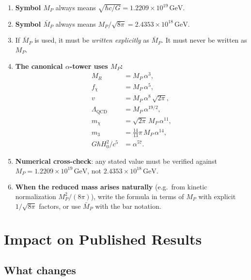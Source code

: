 \documentclass[11pt]{article}
\newcommand{\MP}{M_P}
\newcommand{\MPbar}{\bar{M}_P}
\newcommand{\GeV}{\,\mathrm{GeV}}
\begin{document}
\begin{tcolorbox}[colback=blue!5!white, colframe=blue!60!black,
  title=\textbf{DFD Convention Lock (to be applied in all future documents)}]

\begin{enumerate}
\item \textbf{Symbol $\MP$} always means $\sqrt{\hbar c/G} = 1.2209 \times 10^{19}\GeV$.
\item \textbf{Symbol $\MPbar$} always means $\MP/\sqrt{8\pi} = 2.4353 \times 10^{18}\GeV$.
\item If $\MPbar$ is used, it must be \textit{written explicitly} as $\MPbar$.
  It must never be written as $\MP$.
\item \textbf{The canonical $\alpha$-tower uses $\MP$:}
  \begin{align}
    M_R &= \MP\,\alpha^3, \\
    f_\chi &= \MP\,\alpha^5, \\
    v &= \MP\,\alpha^8\,\sqrt{2\pi}, \\
    \Lambda_\mathrm{QCD} &= \MP\,\alpha^{19/2}, \\
    m_\chi &= \sqrt{2\pi}\,\MP\,\alpha^{11}, \\
    m_3 &= \tfrac{14}{13}\pi\,\MP\,\alpha^{14}, \\
    G\hbar H_0^2/c^5 &= \alpha^{57}.
  \end{align}
\item \textbf{Numerical cross-check}: any stated value must be verified
  against $\MP = 1.2209 \times 10^{19}\GeV$, not $2.4353 \times 10^{18}\GeV$.
\item \textbf{When the reduced mass arises naturally} (e.g.\ from kinetic
  normalization $\MP^2/(8\pi)$), write the formula in terms of $\MP$ with
  explicit $1/\sqrt{8\pi}$ factors, or use $\MPbar$ with the bar notation.
\end{enumerate}
\end{tcolorbox}

\section{Impact on Published Results}

\subsection{What changes}
\end{document}
